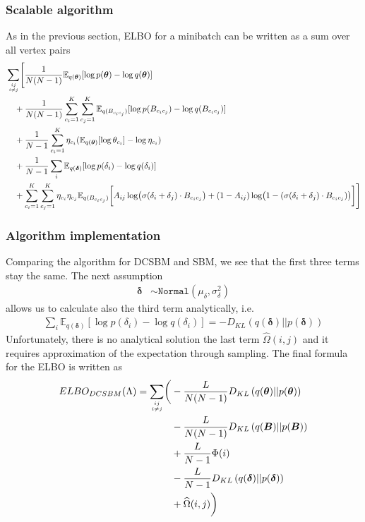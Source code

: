 \documentclass{article}
\renewcommand{\v}[1]{\bm{#1}}
\newcommand{\E}{\mathbb{E}}
\begin{document}
\subsubsection{Scalable algorithm}

As in the previous section, ELBO for a minibatch can be written as a sum over all vertex pairs
\begin{equation}
\begin{split}
& \sum_{ij \atop i \neq j} \Biggl[ \frac{1}{N (N - 1)} \E_{q(\v{\theta})}[\log p(\v{\theta}) - \log q(\v{\theta})]  \\
&  \quad + \frac{1}{N (N - 1)} \sum_{c_i=1}^K \sum_{c_j=1}^K \E_{q(B_{c_ic_j})}[\log p(B_{c_ic_j}) - \log q(B_{c_ic_j})] \\
&  \quad + \frac{1}{N - 1} \sum_{c_i=1}^K \eta_{c_i} (\E_{q(\v{\theta})}[\log \theta_{c_i}] - \log \eta_{c_i}) \\
&  \quad + \frac{1}{N - 1} \sum_i \E_{q(\v{\delta})}[\log p(\delta_i) - \log q(\delta_i)] \\
&  \quad + \sum_{c_i=1}^K \sum_{c_j=1}^K \eta_{c_i} \eta_{c_j}
\E_{q(B_{c_ic_j})}\biggl[ A_{ij} \log \bigl(\sigma(\delta_i + \delta_j) \cdot B_{c_ic_j}\bigr) + (1 - A_{ij}) \log \bigl(1 - (\sigma(\delta_i + \delta_j) \cdot B_{c_ic_j})\bigr) \biggr] \Biggr]
\end{split}
\end{equation}

\subsubsection{Algorithm implementation}

Comparing the algorithm for DCSBM and SBM, we see that the first three terms stay the same. The next assumption
\begin{align*}
\v{\delta} &\sim \mathtt{Normal}(\mu_\delta, \sigma_\delta^2)
\end{align*}
allows us to calculate also the third term analytically, i.e.
\begin{equation}
\begin{split}
\sum_i \E_{q(\v{\delta})}[\log p(\delta_i) - \log q(\delta_i)] = - D_{KL} \left(q(\v{\delta})||p(\v{\delta})\right) 
\end{split}
\end{equation}
Unfortunately, there is no analytical solution the last term $\widehat{\Omega}(i,j)$ and it requires approximation of the expectation through sampling. The final formula for the ELBO is written as
\begin{equation}
\begin{split}
ELBO_{DCSBM}(\Lambda) = \sum_{ij \atop i \neq j} \biggl( &- \frac{L}{N (N - 1)} D_{KL} \left(q(\v{\theta})||p(\v{\theta})\right)\\
\quad &- \frac{L}{N (N - 1)} D_{KL}\left(q(\v{B})||p(\v{B})\right) \\
\quad &+ \frac{L}{N - 1}\Phi(i)\\
\quad &- \frac{L}{N - 1} D_{KL} \left(q(\v{\delta})||p(\v{\delta})\right) \\
\quad &+ \widehat{\Omega}(i,j)   \biggr)
\end{split}
\end{equation} 
\end{document}
